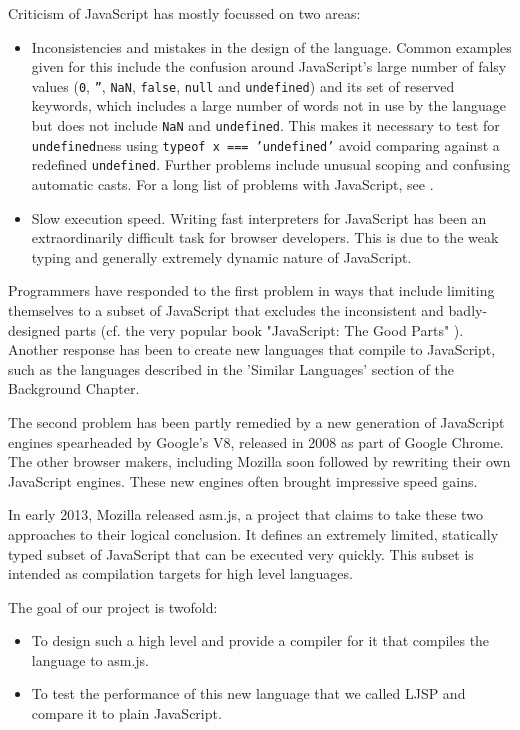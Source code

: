\documentclass[11pt]{report}
\begin{document}
Criticism of JavaScript has mostly focussed on two areas:
\begin{itemize}
\item Inconsistencies and mistakes in the design of the language. Common examples given for this include the confusion around Java\-Script's large number of falsy values (\texttt{0},  \texttt{''}, \texttt{NaN}, \texttt{false}, \texttt{null} and \texttt{undefined}) and its set of reserved keywords, which includes a large number of words not in use by the language but does not include \texttt{NaN} and \texttt{undefined}. This makes it necessary to test for \texttt{undefined}ness using \mbox{\texttt{typeof x === 'undefined'}} avoid comparing against a redefined \texttt{undefined}. Further problems include unusual scoping and confusing automatic casts. For a long list of problems with JavaScript, see \cite{DBLP:books/daglib/0020447}.
\item Slow execution speed. Writing fast interpreters for JavaScript has been an extraordinarily difficult task for browser developers. This is due to the weak typing and generally extremely dynamic nature of JavaScript.
\end{itemize}

Programmers have responded to the first problem in ways that include limiting themselves to a subset of JavaScript that excludes the inconsistent and badly-designed parts (cf. the very popular book "Java\-Script: The Good Parts" \cite{DBLP:books/daglib/0020447}). Another response has been to create new languages that compile to JavaScript, such as the languages described in the 'Similar Languages' section of the Background Chapter.

The second problem has been partly remedied by a new generation of JavaScript engines spearheaded by Google's V8, released in 2008 as part of Google Chrome. The other browser makers, including Mozilla soon followed by rewriting their own JavaScript engines. These new engines often brought impressive speed gains.

In early 2013, Mozilla released asm.js, a project that claims to take these two approaches to their logical conclusion. It defines an extremely limited, statically typed subset of JavaScript that can be executed very quickly. This subset is intended as compilation targets for high level languages.

The goal of our project is twofold:
\begin{itemize}
\item To design such a high level and provide a compiler for it that compiles the language to asm.js.
\item To test the performance of this new language that we called LJSP and compare it to plain JavaScript.
\end{itemize}
\end{document}
